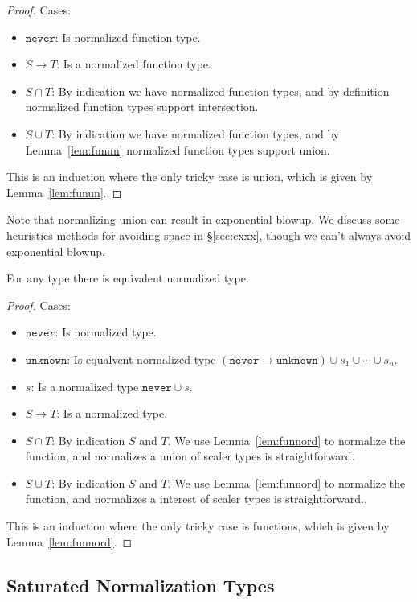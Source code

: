 \documentclass[acmsmall,review,screen]{acmart}
\newcommand{\NEVER}{\mathtt{never}}
\newcommand{\UNKNOWN}{\mathtt{unknown}}
\newcommand{\fun}{\mathbin{\rightarrow}}
\begin{document}
\begin{proof}
  Cases:
  \begin{itemize}
  \item $\NEVER$: Is normalized function type.
  \item $S \fun T$: Is a normalized function type.
  \item $S \cap T$: By indication we have normalized function types,
    and by definition normalized function types support intersection.
  \item $S \cup T$: By indication we have normalized function types,
    and by Lemma~\ref{lem:funun} normalized function types support union.
  \end{itemize}
  This is an induction where the only tricky case is union, which is given by Lemma~\ref{lem:funun}.
\end{proof}
Note that normalizing union can result in exponential blowup.
We discuss some heuristics methods for avoiding space in \S\ref{sec:cxxx},
though we can't always avoid exponential blowup.

\begin{lemma}
  For any type there is equivalent normalized type.
\end{lemma}

\begin{proof}
  Cases:
  \begin{itemize}
  \item $\NEVER$: Is normalized type.
  \item $\UNKNOWN$: Is equalvent normalized type $(\NEVER \fun \UNKNOWN) \cup s_1 \cup \cdots \cup s_n$.
  \item $s$: Is a normalized type $\NEVER \cup s$.
  \item $S \fun T$: Is a normalized type.
  \item $S \cap T$: By indication $S$ and $T$. We use Lemma~\ref{lem:funnord}
    to normalize the function, and normalizes a union of scaler types is straightforward.
  \item $S \cup T$: By indication $S$ and $T$. We use Lemma~\ref{lem:funnord}
    to normalize the function, and normalizes a interest of scaler types is straightforward..
  \end{itemize}
  This is an induction where the only tricky case is functions, which is given by Lemma~\ref{lem:funnord}.
\end{proof}

\subsection{Saturated Normalization Types}
\label{subsec:saturated}
\end{document}

